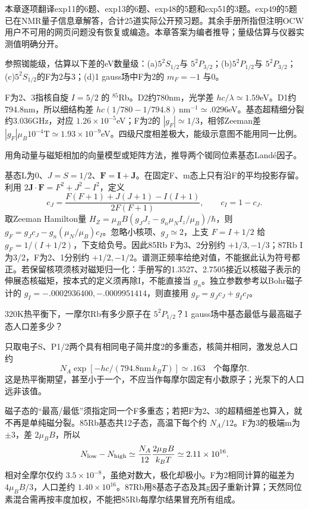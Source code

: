 本章逐项翻译exp11的6题、exp13的6题、exp48的5题和exp51的3题。exp49的5题已在NMR量子信息章解答，合计25道实际公开预习题。其余手册所指但注明OCW用户不可用的网页问题没有恢复或编造。本章答案为编者推导；量级估算与仪器实测值明确分开。

\begin{exercise}\label{task:exp11-1}
参照铷能级，估算以下差的eV数量级：(a)$5^2S_{1/2}$与 $5^2P_{3/2}$；(b)$5^2P_{1/2}$与 $5^2P_{3/2}$；(c)$5^2S_{1/2}$的F为2与3；(d)1 gauss场中F为2的 $m_F=-1$ 与0。
\end{exercise}
\begin{solution}
F为2、3指核自旋 $I=5/2$ 的 $^{85}$Rb。D2约780nm，光学差 $hc/\lambda\simeq1.59$eV。D1约794.8nm，所以细结构差 $hc(1/780-1/794.8)\,\mathrm{nm}^{-1}\simeq.0296$eV。基态超精细分裂约3.036GHz，对应 $1.26\times10^{-5}$eV；F为2的 $|g_F|\simeq1/3$，相邻Zeeman差 $|g_F|\mu_B10^{-4}\mathrm T\simeq1.93\times10^{-9}$eV。四级尺度相差极大，能级示意图不能用同一比例。
\end{solution}
\begin{exercise}\label{task:exp11-2}
用角动量与磁矩相加的向量模型或矩阵方法，推导两个铷同位素基态Landé因子。
\end{exercise}
\begin{solution}
基态L为0、$J=S=1/2$、$\mathbf F=\mathbf I+\mathbf J$。在固定F、m态上只有沿F的平均投影存留。利用 $2\mathbf J\cdot\mathbf F=F^2+J^2-I^2$，定义
\[
 c_J=\frac{F(F+1)+J(J+1)-I(I+1)}{2F(F+1)},\qquad c_I=1-c_J.
\]
取Zeeman Hamilton量 $H_Z=\mu_BB(g_JJ_z-g_n\mu_N I_z/\mu_B)/\hbar$，则 $g_F=g_Jc_J-g_n(\mu_N/\mu_B)c_I$。忽略小核项、$g_J\simeq2$，上支 $F=I+1/2$ 给 $g_F=1/(I+1/2)$，下支给负号。因此85Rb F为3、2分别约 $+1/3,-1/3$；87Rb I为3/2，F为2、1分别约 $+1/2,-1/2$。谱测正频率给绝对值，不能据此认为符号都正。若保留核项须核对磁矩归一化：手册写的1.3527、2.7505接近以核磁子表示的伸展态核磁矩，按本式的定义须再除I，不能直接当 $g_n$。独立参数参考以Bohr磁子计的 $g_I=-.0002936400,-.0009951414$，则直接用 $g_F=g_Jc_J+g_Ic_I$。
\end{solution}
\begin{exercise}\label{task:exp11-3}
320K热平衡下，一摩尔Rb有多少原子在 $5^2P_{1/2}$？1 gauss场中基态最低与最高磁子态人口差多少？
\end{exercise}
\begin{solution}
只取电子S、P1/2两个具有相同电子简并度2的多重态，核简并相同，激发总人口约
\[
 N_A\exp[-hc/(794.8\mathrm{nm}\,k_BT)]\simeq.163\quad\text{个每摩尔}.
\]
这是热平衡期望，甚至小于一个，不应当作每摩尔固定有小数原子；光泵下的人口远非该值。

磁子态的“最高/最低”须指定同一个F多重态；若把F为2、3的超精细差也算入，就不再是单纯磁分裂。85Rb基态共12子态，高温下每个约 $N_A/12$。F为3的极端m为 $\pm3$，差 $2\mu_BB$，所以
\[
 N_{\rm low}-N_{\rm high}\simeq\frac{N_A}{12}\frac{2\mu_BB}{k_BT}
 \simeq2.11\times10^{16}.
\]
相对全摩尔仅约 $3.5\times10^{-8}$，虽绝对数大，极化却极小。F为2相同计算的磁差为 $4\mu_BB/3$，人口差约 $1.40\times10^{16}$。87Rb用8基态子态及其g因子重新计算；天然同位素混合需再按丰度加权，不能把85Rb每摩尔结果冒充所有组成。
\end{solution}
